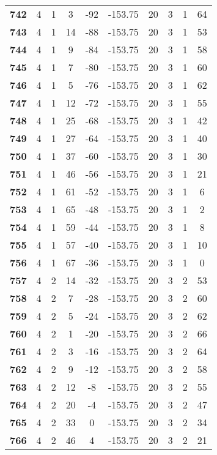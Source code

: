 \documentclass[12pt,letterpaper, onecolumn]{exam}
\begin{document}
\begin{longtable}{cccccccccc}
    \textbf{742} & 4 & 1 & 3 & -92 & -153.75 & 20 & 3 & 1 & 64 \\ 
    \textbf{743} & 4 & 1 & 14 & -88 & -153.75 & 20 & 3 & 1 & 53 \\ 
    \textbf{744} & 4 & 1 & 9 & -84 & -153.75 & 20 & 3 & 1 & 58 \\ 
    \textbf{745} & 4 & 1 & 7 & -80 & -153.75 & 20 & 3 & 1 & 60 \\ 
    \textbf{746} & 4 & 1 & 5 & -76 & -153.75 & 20 & 3 & 1 & 62 \\ 
    \textbf{747} & 4 & 1 & 12 & -72 & -153.75 & 20 & 3 & 1 & 55 \\ 
    \textbf{748} & 4 & 1 & 25 & -68 & -153.75 & 20 & 3 & 1 & 42 \\ 
    \textbf{749} & 4 & 1 & 27 & -64 & -153.75 & 20 & 3 & 1 & 40 \\ 
    \textbf{750} & 4 & 1 & 37 & -60 & -153.75 & 20 & 3 & 1 & 30 \\ 
    \textbf{751} & 4 & 1 & 46 & -56 & -153.75 & 20 & 3 & 1 & 21 \\ 
    \textbf{752} & 4 & 1 & 61 & -52 & -153.75 & 20 & 3 & 1 & 6 \\ 
    \textbf{753} & 4 & 1 & 65 & -48 & -153.75 & 20 & 3 & 1 & 2 \\ 
    \textbf{754} & 4 & 1 & 59 & -44 & -153.75 & 20 & 3 & 1 & 8 \\ 
    \textbf{755} & 4 & 1 & 57 & -40 & -153.75 & 20 & 3 & 1 & 10 \\ 
    \textbf{756} & 4 & 1 & 67 & -36 & -153.75 & 20 & 3 & 1 & 0 \\ 
    \textbf{757} & 4 & 2 & 14 & -32 & -153.75 & 20 & 3 & 2 & 53 \\ 
    \textbf{758} & 4 & 2 & 7 & -28 & -153.75 & 20 & 3 & 2 & 60 \\ 
    \textbf{759} & 4 & 2 & 5 & -24 & -153.75 & 20 & 3 & 2 & 62 \\ 
    \textbf{760} & 4 & 2 & 1 & -20 & -153.75 & 20 & 3 & 2 & 66 \\ 
    \textbf{761} & 4 & 2 & 3 & -16 & -153.75 & 20 & 3 & 2 & 64 \\ 
    \textbf{762} & 4 & 2 & 9 & -12 & -153.75 & 20 & 3 & 2 & 58 \\ 
    \textbf{763} & 4 & 2 & 12 & -8 & -153.75 & 20 & 3 & 2 & 55 \\ 
    \textbf{764} & 4 & 2 & 20 & -4 & -153.75 & 20 & 3 & 2 & 47 \\ 
    \textbf{765} & 4 & 2 & 33 & 0 & -153.75 & 20 & 3 & 2 & 34 \\ 
    \textbf{766} & 4 & 2 & 46 & 4 & -153.75 & 20 & 3 & 2 & 21 \\ 

\end{longtable}
\end{document}
